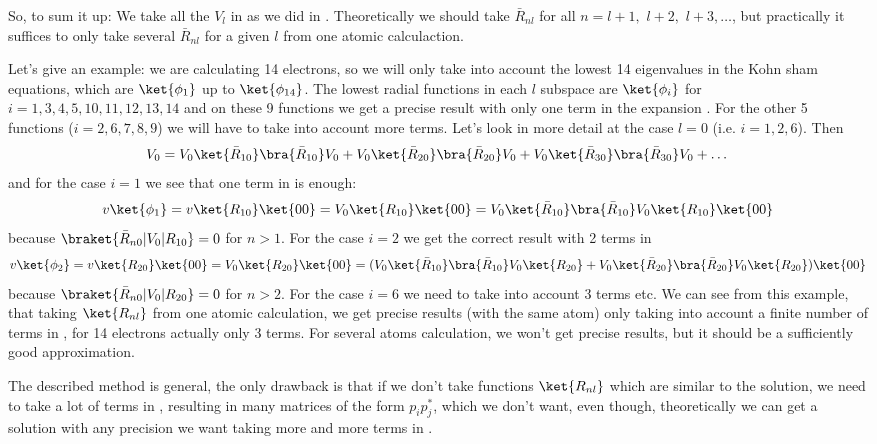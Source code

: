 So, to sum it up: We take all the $V_l$ in   as we did in .
Theoretically we should take $\bar R_{nl}$ for all 
$n=l+1,\,\, l+2,\,\,l+3,\dots$, 
but practically it suffices to only take several $\bar R_{nl}$ for a given $l$
from one atomic calculaction.

Let's give an example: we are calculating 14 electrons, so we will only
take into account the lowest 14 eigenvalues in the Kohn sham equations, which
are $\ket{\phi_1}$ up to $\ket{\phi_{14}}$. The lowest radial functions in each
$l$ subspace are $\ket{\phi_i}$ for $i=1,3,4,5,10,11,12,13,14$ and on these 9
functions we get a precise result with only one term in the expansion
. For the other 5 functions ($i=2,6,7,8,9$) we will have to take into
account more terms. Let's look in more detail at the case $l=0$ (i.e.
$i=1,2,6$). Then 
$$V_0=
V_0\ket{\bar R_{10}}\bra{\bar R_{10}}V_0+
V_0\ket{\bar R_{20}}\bra{\bar R_{20}}V_0+
V_0\ket{\bar R_{30}}\bra{\bar R_{30}}V_0+
\dots
$$
and for the case $i=1$ we see that one term in  is enough:
$$v\ket{\phi_1}=v\ket{R_{10}}\ket{00}=V_0\ket{R_{10}}\ket{00}=
V_0\ket{\bar R_{10}}\bra{\bar R_{10}}V_0\ket{R_{10}}\ket{00}
$$
because $\braket{\bar R_{n0}|V_0|R_{10}}=0$ for $n>1$.
For the case $i=2$ we get the correct result with 2 terms in 
$$v\ket{\phi_2}=v\ket{R_{20}}\ket{00}=V_0\ket{R_{20}}\ket{00}=(
V_0\ket{\bar R_{10}}\bra{\bar R_{10}}V_0\ket{R_{20}}+
V_0\ket{\bar R_{20}}\bra{\bar R_{20}}V_0\ket{R_{20}}
)\ket{00}
$$
because $\braket{\bar R_{n0}|V_0|R_{20}}=0$ for $n>2$.
For the case $i=6$ we need to take into account 3 terms etc. 
We can see from this example, that taking $\ket{R_{nl}}$ from one atomic
calculation, we get precise results (with the same atom) only taking into
account a finite number of terms in , for 14 electrons actually only
3 terms. For several atoms calculation, we won't get precise results, but it
should be a sufficiently good approximation.

The described method is general, the only drawback is that if we don't take
functions $\ket{R_{nl}}$ which are similar to the solution, we need to take a
lot of terms in , resulting in many matrices of the form $p_ip_j^*$,
which we don't want, even though, theoretically we can get a solution with any
precision we want taking more and more terms in .
